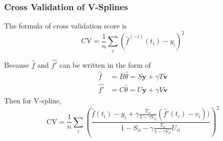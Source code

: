 \documentclass{beamer}
\begin{document}
\begin{frame}
\frametitle{Cross Validation of V-Splines}

The formula of cross validation score is 
\begin{equation}
\mbox{CV}=\frac{1}{n}\sum_i (\hat{f}^{(-i)}(t_i)-y_i)^2
\end{equation}

Because $\hat{f}$ and $\hat{f'}$ can be written in the form of
\begin{equation}\label{linearformofF}
\begin{split}
\hat{f} &=B\hat{\theta}=S\mathbf{y}+\gamma T\mathbf{v}\\
\hat{f'}&=C\hat{\theta}=U\mathbf{y}+\gamma V\mathbf{v}
\end{split}
\end{equation}
Then for V-spline, 
\begin{equation}
\mbox{CV}=\frac{1}{n}\sum_i \left(\frac{\hat{f}(t_i)-y_i+\gamma \frac{T_{ii}}{1-\gamma V_{ii}}(\hat{f}'(t_i)-v_i)) }{1-S_{ii}-\gamma \frac{T_{ii}}{1-\gamma V_{ii}}U_{ii}}\right)^2
\end{equation}
\end{frame}


\end{document}
